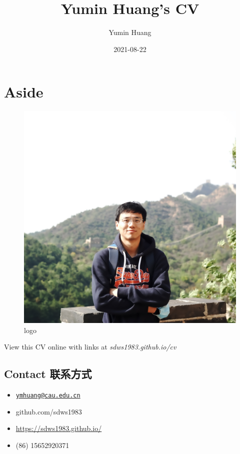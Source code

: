 \documentclass[]{article}
\title{Yumin Huang's CV}
\author{Yumin Huang}
\date{2021-08-22}
\providecommand{\tightlist}{%
  \setlength{\itemsep}{0pt}\setlength{\parskip}{0pt}}
\begin{document}
\maketitle

\hypertarget{aside}{%
\section{Aside}\label{aside}}

\begin{figure}
\centering
\includegraphics[width=1\textwidth,height=\textheight]{ymhuang.jpeg}
\caption{logo}
\end{figure}

View this CV online with links at \emph{sdws1983.github.io/cv}

\hypertarget{contact}{%
\subsection{Contact 联系方式}\label{contact}}

\begin{itemize}
\tightlist
\item
   \href{mailto:ymhuang@cau.edu.cn}{\nolinkurl{ymhuang@cau.edu.cn}}
\item
   github.com/sdws1983
\item
   \url{https://sdws1983.github.io/}
\item
   (86) 15652920371
\end{itemize}
\end{document}
